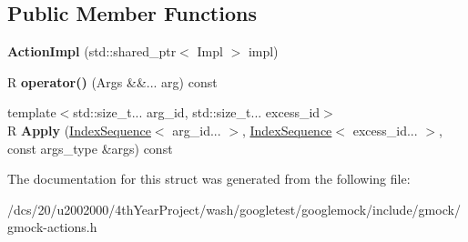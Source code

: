 \subsection*{Public Member Functions}
\begin{DoxyCompactItemize}
\item 
\mbox{\label{structtesting_1_1internal_1_1ActionImpl_3_01R_07Args_8_8_8_08_00_01Impl_01_4_afc5fe33da4094b1be005bc182d1d2d31}} 
{\bfseries Action\+Impl} (std\+::shared\+\_\+ptr$<$ Impl $>$ impl)
\item 
\mbox{\label{structtesting_1_1internal_1_1ActionImpl_3_01R_07Args_8_8_8_08_00_01Impl_01_4_a97a9ef032b3804ba69ca675a0edb2843}} 
R {\bfseries operator()} (Args \&\&... arg) const
\item 
\mbox{\label{structtesting_1_1internal_1_1ActionImpl_3_01R_07Args_8_8_8_08_00_01Impl_01_4_add15fbdb69e763e8e2902e090fb77110}} 
{\footnotesize template$<$std\+::size\+\_\+t... arg\+\_\+id, std\+::size\+\_\+t... excess\+\_\+id$>$ }\\R {\bfseries Apply} (\mbox{\hyperlink{structtesting_1_1internal_1_1IndexSequence}{Index\+Sequence}}$<$ arg\+\_\+id... $>$, \mbox{\hyperlink{structtesting_1_1internal_1_1IndexSequence}{Index\+Sequence}}$<$ excess\+\_\+id... $>$, const args\+\_\+type \&args) const
\end{DoxyCompactItemize}


The documentation for this struct was generated from the following file\+:\begin{DoxyCompactItemize}
\item 
/dcs/20/u2002000/4th\+Year\+Project/wash/googletest/googlemock/include/gmock/gmock-\/actions.\+h\end{DoxyCompactItemize}
